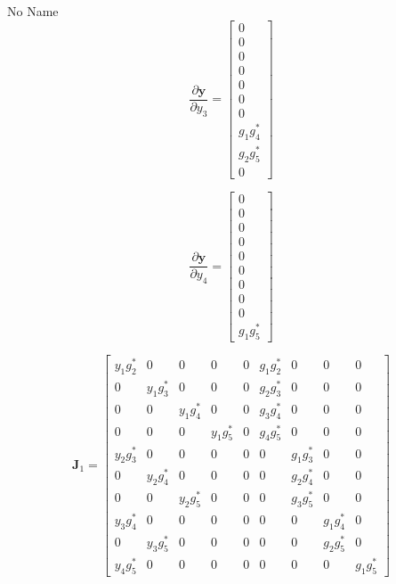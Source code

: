 \documentclass[a4paper,10pt]{article}
\begin{document}
\begin{section}{No Name}
\begin{equation}
\frac{\partial\boldsymbol{y}}{\partial y_3} = 
\begin{bmatrix}
 0\\
 0\\
 0\\
 0\\
 0\\
 0\\
 0\\
 g_1g_4^*\\
 g_2g_5^*\\
 0
\end{bmatrix}
\end{equation}


\begin{equation}
\frac{\partial\boldsymbol{y}}{\partial y_4} = 
\begin{bmatrix}
 0\\
 0\\
 0\\
 0\\
 0\\
 0\\
 0\\
 0\\
 0\\
 g_1g_5^*
\end{bmatrix}
\end{equation}

\begin{equation}
\boldsymbol{J}_1 = 
\begin{bmatrix}
 y_1 g_2^* &0&0&0&0&g_1g_2^*&0&0&0\\
 0 &y_1g_3^*&0&0&0&g_2g_3^*&0&0&0\\
 0 &0&y_1g_4^*&0&0&g_3g_4^*&0&0&0\\
 0 &0&0&y_1g_5^*&0&g_4g_5^*&0&0&0\\
 y_2 g_3^* &0&0&0&0&0&g_1g_3^*&0&0\\
 0 &y_2g_4^*&0&0&0&0&g_2g_4^*&0&0\\
 0 &0&y_2g_5^*&0&0&0&g_3g_5^*&0&0\\
 y_3 g_4^* &0&0&0&0&0&0&g_1g_4^*&0\\
 0 &y_3g_5^*&0&0&0&0&0&g_2g_5^*&0\\
 y_4 g_5^*&0&0&0&0&0&0&0&g_1g_5^*                   
\end{bmatrix}
\end{equation}



\end{section}
\end{document}
